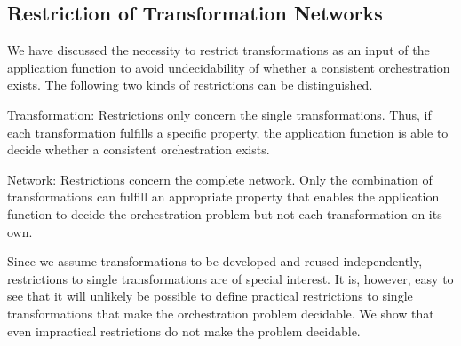 \subsection{Restriction of Transformation Networks}
\label{chap:orchestration:decidability:restriction}

We have discussed the necessity to restrict transformations as an input of the application function to avoid undecidability of whether a consistent orchestration exists.
The following two kinds of restrictions can be distinguished.
\begin{properdescription}
    \item[Transformation:] Restrictions only concern the single transformations. Thus, if each transformation fulfills a specific property, the application function is able to decide whether a consistent orchestration exists.
    \item[Network:] Restrictions concern the complete network. Only the combination of transformations can fulfill an appropriate property that enables the application function to decide the orchestration problem but not each transformation on its own.
\end{properdescription}

Since we assume transformations to be developed and reused independently, restrictions to single transformations are of special interest.
It is, however, easy to see that it will unlikely be possible to define practical restrictions to single transformations that make the orchestration problem decidable.
We show that even impractical restrictions do not make the problem decidable.

